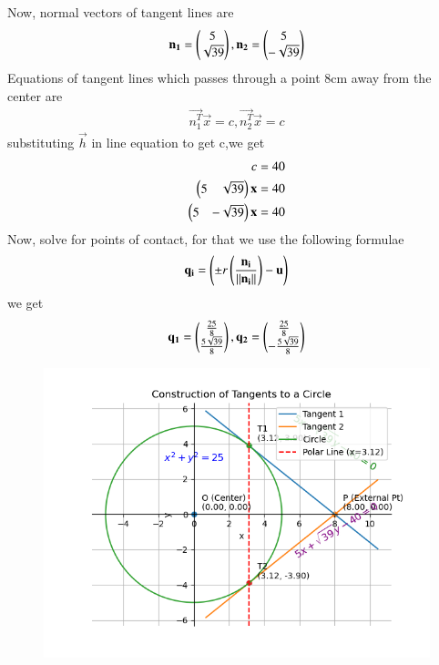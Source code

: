 \documentclass[journal]{IEEEtran}
\begin{document}
Now, normal vectors of tangent lines are
\begin{align}
    \mathbf{n_1}=\begin{pmatrix}5\\ \sqrt{39}\end{pmatrix},\mathbf{n_2}=\begin{pmatrix}5\\ -\sqrt{39}\end{pmatrix}
\end{align}
Equations of tangent lines which passes through a point 8cm away from the center are
\begin{align}
    \vec{n_1^T}\vec{x}=c,\vec{n_2^T}\vec{x}=c
\end{align}
substituting $\vec{h}$ in line equation to get c,we get
\begin{align}
    c=40\\
    \begin{pmatrix}5&\sqrt{39}\end{pmatrix}\mathbf{x}=40\\
    \begin{pmatrix}5&-\sqrt{39}\end{pmatrix}\mathbf{x}=40
\end{align}
Now, solve for points of contact, for that we use the following formulae
\begin{align}
    \mathbf{q_i}=\left(\pm r\left(\frac{\mathbf{n_i}}{\left\lVert\mathbf{n_i}\right\rVert}\right)-\mathbf{u}\right)
\end{align}
we get
\begin{align}
    \mathbf{q_1}=\begin{pmatrix}\frac{25}{8}\\\frac{5\sqrt{39}}{8}\end{pmatrix},
    \mathbf{q_2}=\begin{pmatrix}\frac{25}{8}\\-\frac{5\sqrt{39}}{8}\end{pmatrix}
\end{align}
\newpage
    \begin{figure}
    \centering
    \caption{}
    \includegraphics[width=0.9\columnwidth]{figs/Figure_1.png}
    \label{fig:placeholder}
\end{figure}
\end{document}
